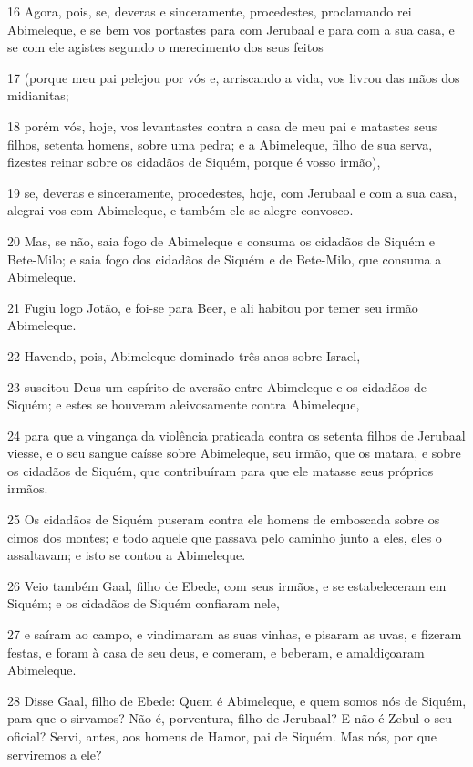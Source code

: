 \par 16 Agora, pois, se, deveras e sinceramente, procedestes, proclamando rei Abimeleque, e se bem vos portastes para com Jerubaal e para com a sua casa, e se com ele agistes segundo o merecimento dos seus feitos
\par 17 (porque meu pai pelejou por vós e, arriscando a vida, vos livrou das mãos dos midianitas;
\par 18 porém vós, hoje, vos levantastes contra a casa de meu pai e matastes seus filhos, setenta homens, sobre uma pedra; e a Abimeleque, filho de sua serva, fizestes reinar sobre os cidadãos de Siquém, porque é vosso irmão),
\par 19 se, deveras e sinceramente, procedestes, hoje, com Jerubaal e com a sua casa, alegrai-vos com Abimeleque, e também ele se alegre convosco.
\par 20 Mas, se não, saia fogo de Abimeleque e consuma os cidadãos de Siquém e Bete-Milo; e saia fogo dos cidadãos de Siquém e de Bete-Milo, que consuma a Abimeleque.
\par 21 Fugiu logo Jotão, e foi-se para Beer, e ali habitou por temer seu irmão Abimeleque.
\par 22 Havendo, pois, Abimeleque dominado três anos sobre Israel,
\par 23 suscitou Deus um espírito de aversão entre Abimeleque e os cidadãos de Siquém; e estes se houveram aleivosamente contra Abimeleque,
\par 24 para que a vingança da violência praticada contra os setenta filhos de Jerubaal viesse, e o seu sangue caísse sobre Abimeleque, seu irmão, que os matara, e sobre os cidadãos de Siquém, que contribuíram para que ele matasse seus próprios irmãos.
\par 25 Os cidadãos de Siquém puseram contra ele homens de emboscada sobre os cimos dos montes; e todo aquele que passava pelo caminho junto a eles, eles o assaltavam; e isto se contou a Abimeleque.
\par 26 Veio também Gaal, filho de Ebede, com seus irmãos, e se estabeleceram em Siquém; e os cidadãos de Siquém confiaram nele,
\par 27 e saíram ao campo, e vindimaram as suas vinhas, e pisaram as uvas, e fizeram festas, e foram à casa de seu deus, e comeram, e beberam, e amaldiçoaram Abimeleque.
\par 28 Disse Gaal, filho de Ebede: Quem é Abimeleque, e quem somos nós de Siquém, para que o sirvamos? Não é, porventura, filho de Jerubaal? E não é Zebul o seu oficial? Servi, antes, aos homens de Hamor, pai de Siquém. Mas nós, por que serviremos a ele?
